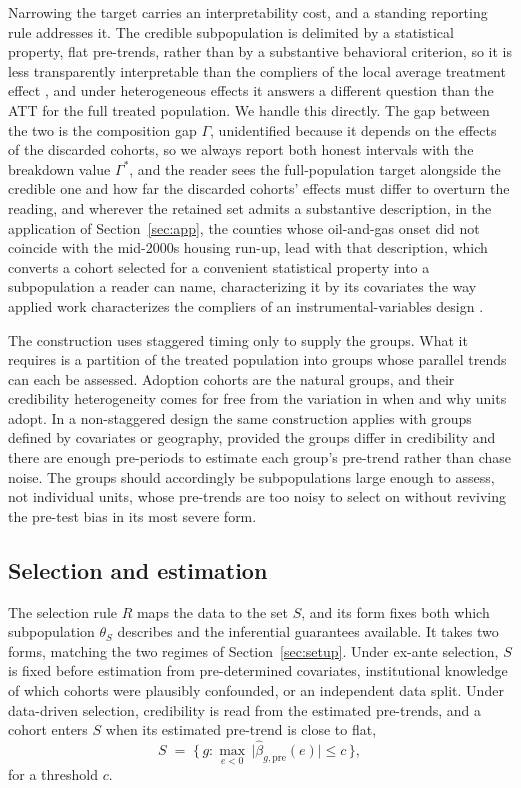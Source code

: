\documentclass[12pt]{article}
\theoremstyle{remark}
\begin{document}
Narrowing the target carries an interpretability cost, and a standing reporting rule addresses it. The
credible subpopulation is delimited by a statistical property, flat pre-trends, rather than by a
substantive behavioral criterion, so it is less transparently interpretable than the compliers of the local
average treatment effect \citep{imbens1994}, and under heterogeneous effects it answers a different question
than the ATT for the full treated population. We handle this directly. The gap between the two is the
composition gap $\Gamma$, unidentified because it depends on the effects of the discarded cohorts, so we
always report both honest intervals with the breakdown value $\Gamma^\ast$, and the reader sees the
full-population target alongside the credible one and how far the discarded cohorts' effects must differ to
overturn the
reading, and wherever the retained set admits a substantive description, in the application of
Section~\ref{sec:app}, the counties whose oil-and-gas onset did not coincide with the mid-2000s housing
run-up, lead with that description, which converts a cohort selected for a convenient statistical
property into a subpopulation a reader can name, characterizing it by its covariates the way applied work
characterizes the compliers of an instrumental-variables design \citep{abadie2003}.

The construction uses staggered timing only to supply the groups. What it requires is a partition of the
treated population into groups whose parallel trends can each be assessed. Adoption cohorts are the
natural groups, and their credibility heterogeneity comes for free from the variation in when and why
units adopt. In a non-staggered design the same construction applies with groups defined by covariates or
geography, provided the groups differ in credibility and there are enough pre-periods to estimate each
group's pre-trend rather than chase noise. The groups should accordingly be subpopulations large enough
to assess, not individual units, whose pre-trends are too noisy to select on without reviving the
pre-test bias in its most severe form.

\subsection{Selection and estimation}\label{sec:select}

The selection rule $R$ maps the data to the set $S$, and its form fixes both which subpopulation
$\theta_S$ describes and the inferential guarantees available. It takes two forms, matching the two
regimes of Section~\ref{sec:setup}. Under ex-ante selection, $S$ is fixed before estimation from
pre-determined covariates, institutional knowledge of which cohorts were plausibly confounded, or an
independent data split. Under data-driven selection, credibility is read from the estimated
pre-trends, and a cohort enters $S$ when its estimated pre-trend is close to flat,
\begin{equation}
S \;=\; \big\{\, g : \max_{e<0}\, \lvert \hat\beta_{g,\mathrm{pre}}(e)\rvert \le c \,\big\},
\label{eq:rule}
\end{equation}
for a threshold $c$.
\end{document}
